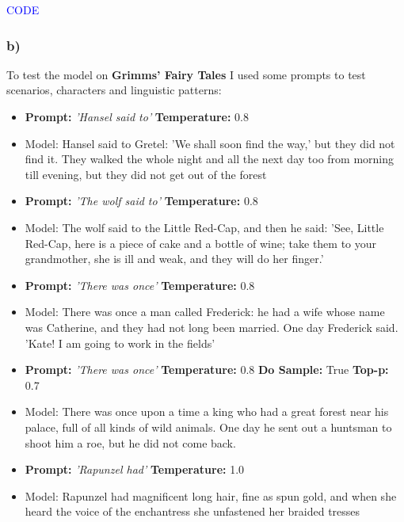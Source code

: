 \documentclass{article}
\begin{document}
\textcolor{blue}{CODE}

\subsubsection*{b)}

To test the model on \textbf{Grimms' Fairy Tales} I used some prompts to test scenarios, characters and linguistic patterns:

\begin{itemize}
    \item \textbf{Prompt:} \textit{'Hansel said to'} \textbf{Temperature:} 0.8
    \item Model: Hansel said to Gretel: 'We shall soon find the way,' but they did not find it. They walked the whole night and all the next day too from morning till evening, but they did not get out of the forest
\end{itemize}

\begin{itemize}
    \item \textbf{Prompt:} \textit{'The wolf said to'} \textbf{Temperature:} 0.8
    \item Model: The wolf said to the Little Red-Cap, and then he said: 'See, Little Red-Cap, here is a piece
of cake and a bottle of wine; take them to your grandmother, she is ill
and weak, and they will do her finger.'
\end{itemize}

\begin{itemize}
    \item \textbf{Prompt:} \textit{'There was once'} \textbf{Temperature:} 0.8
    \item Model: There was once a man called Frederick: he had a wife whose name was
Catherine, and they had not long been married. One day Frederick said.
'Kate! I am going to work in the fields'
\end{itemize}

\begin{itemize}
    \item \textbf{Prompt:} \textit{'There was once'} \textbf{Temperature:} 0.8 \textbf{Do Sample:} True \textbf{Top-p:} 0.7
    \item Model: There was once upon a time a king who had a great forest near his
    palace, full of all kinds of wild animals. One day he sent out a
    huntsman to shoot him a roe, but he did not come back.
\end{itemize}

\begin{itemize}
    \item \textbf{Prompt:} \textit{'Rapunzel had'} \textbf{Temperature:} 1.0
    \item Model: Rapunzel had magnificent long hair, fine as spun gold, and when she
heard the voice of the enchantress she unfastened her braided tresses
\end{itemize}
\end{document}
